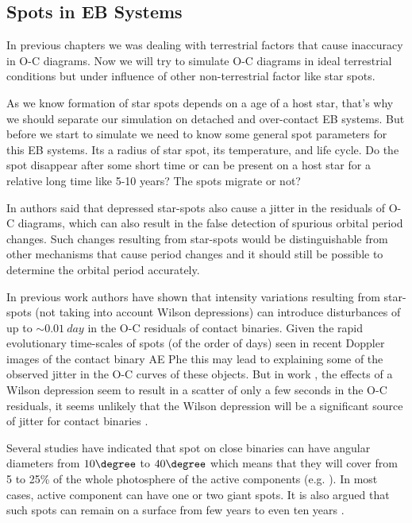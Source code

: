 \subsection{Spots in EB Systems}
In previous chapters we was dealing with terrestrial factors that cause inaccuracy in O-C diagrams. 
Now we will try to simulate O-C diagrams in ideal terrestrial conditions but under influence of other non-terrestrial factor like star spots.

As we know formation of star spots depends on a age of a host star, that's why we should separate our simulation on detached and over-contact EB systems.  
But before we start to simulate we need to know some general spot parameters for this EB systems. Its a radius of star spot, its temperature, and life cycle. Do the spot disappear after some short time or can be present on a host star for a relative long time like 5-10 years? The spots migrate or not?   

In \cite{Watson2004} authors said that depressed star-spots also cause a jitter in the residuals of O-C
diagrams, which can also result in the false detection of spurious orbital period changes. Such changes resulting from star-spots
would be distinguishable from other mechanisms that cause period
changes and it should still be possible to determine the orbital period accurately.

In previous work \cite{Kalimeris2002} authors have
shown that intensity variations resulting from star-spots (not taking into account Wilson depressions) can introduce disturbances of
up to $\sim 0.01~day$ in the O-C residuals of contact binaries. Given the
rapid evolutionary time-scales of spots (of the order of days) seen in
recent Doppler images of the contact binary AE Phe \citep{Barnes2004} 
this may lead to explaining some of the observed jitter in the
O-C curves of these objects. But in work \cite{Watson2004}, the effects of a
Wilson depression seem to result in a scatter of only a few seconds
in the O-C residuals, it seems unlikely that the Wilson depression
will be a significant source of jitter for contact binaries \citep{Watson2004}.

Several studies have indicated that spot  on close binaries can have angular diameters from $10\degree$ to $40\degree$ which means that they
will cover from 5 to 25\% of the whole photosphere of the active components (e.g. \cite{Hall1990, Guinan1993}).
In most cases, active component can have one or two giant spots. It is also argued that such spots can remain on a surface from few years to even ten years \citep{Kalimeris2002}. 

